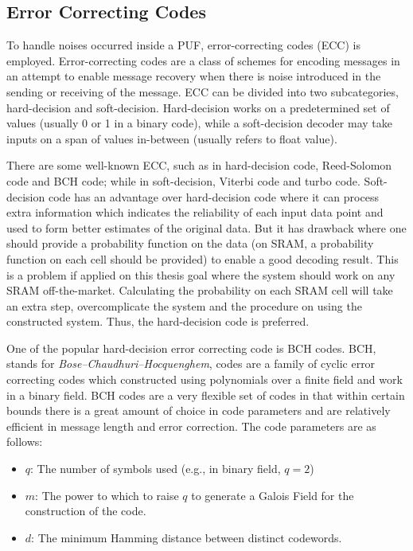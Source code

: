 \subsection{Error Correcting Codes}
To handle noises occurred inside a PUF, error-correcting codes (ECC) is employed.
Error-correcting codes are a class of schemes for encoding messages in an attempt to enable message recovery when there is noise introduced in the sending or receiving of the message. ECC can be divided into two subcategories, hard-decision and soft-decision. Hard-decision works on a predetermined set of values (usually 0 or 1 in a binary code), while a soft-decision decoder may take inputs on a span of values in-between (usually refers to float value).

There are some well-known ECC, such as in hard-decision code, Reed-Solomon code and BCH code; while in soft-decision, Viterbi code and turbo code. Soft-decision code has an advantage over hard-decision code where it can process extra information which indicates the reliability of each input data point and used to form better estimates of the original data. But it has drawback where one should provide a probability function on the data (on SRAM, a probability function on each cell should be provided) to enable a good decoding result. This is a problem if applied on this thesis goal where the system should work on any SRAM off-the-market. Calculating the probability on each SRAM cell will take an extra step, overcomplicate the system and the procedure on using the constructed system. Thus, the hard-decision code is preferred.

One of the popular hard-decision error correcting code is BCH codes. BCH, stands for \textit{Bose–Chaudhuri–Hocquenghem}, codes are a family of cyclic error correcting codes which constructed using polynomials over a finite field and work in a binary field.
BCH codes are a very flexible set of codes in that within certain bounds there is a great amount of choice in code parameters and are relatively efficient in message length and error correction. The code parameters are as follows:
\begin{itemize}
\item $q$: The number of symbols used (e.g., in binary field, $q = 2$)
\item $m$: The power to which to raise $q$ to generate a Galois Field for the construction of the code.
\item $d$: The minimum Hamming distance between distinct codewords.
\end{itemize}

